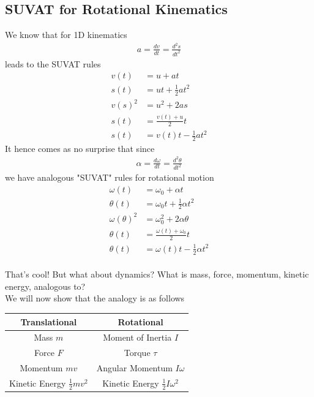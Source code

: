 \documentclass{article}
\begin{document}
\subsection{SUVAT for Rotational Kinematics}
We know that for 1D kinematics
\begin{align}
    a = \frac{dv}{dt} = \frac{d^2 s}{dt^2}
\end{align}
leads to the SUVAT rules
\begin{align}
v(t)&=u+a t  \\
s(t)&=u t+\frac{1}{2} a t^2 \\
 v(s)^2&=u^2+2 a s  \\
 s(t)&=\frac{v(t)+u}{2} t \\
 s(t)&=v(t) t-\frac{1}{2} a t^2 
\end{align}
It hence comes as no surprise that since
\begin{align}
    \alpha = \frac{d\omega}{dt} = \frac{d^2 \theta}{dt^2}
\end{align}
we have analogous "SUVAT" rules for rotational motion
\begin{align}
\omega(t)&=\omega_0+\alpha t \\
\theta (t)&=\omega_0 t+\frac{1}{2} \alpha t^2 \\
 \omega(\theta )^2&=\omega_0^2+2 
 \alpha \theta  \\
 \theta (t)&=\frac{\omega(t)+\omega_0}{2} t \\
 \theta (t)&=\omega(t) t-\frac{1}{2} 
 \alpha t^2 
\end{align}\\[0pt]
That's cool! But what about dynamics? What is mass, force, momentum, kinetic energy, analogous to? \\[10pt]
We will now show that the analogy is as follows
\begin{center}
\begin{tabular}{ |c|c| } 
 \hline
  Translational & Rotational \\ \hline \hline
  Mass $m$ & Moment of Inertia $I$ \\ \hline
  Force $F$ & Torque $\tau$ \\ \hline
  Momentum $mv$ & Angular Momentum  $I\omega$\\\hline
  Kinetic Energy $\frac{1}{2}mv^2$ & Kinetic Energy $\frac{1}{2} I \omega^2$ \\\hline
\end{tabular}
\end{center}
\end{document}
